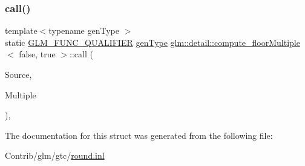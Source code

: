 \subsubsection{\texorpdfstring{call()}{call()}}
{\footnotesize\ttfamily template$<$typename gen\+Type $>$ \\
static \mbox{\hyperlink{setup_8hpp_a33fdea6f91c5f834105f7415e2a64407}{G\+L\+M\+\_\+\+F\+U\+N\+C\+\_\+\+Q\+U\+A\+L\+I\+F\+I\+ER}} \mbox{\hyperlink{structglm_1_1detail_1_1gen_type}{gen\+Type}} \mbox{\hyperlink{structglm_1_1detail_1_1compute__floor_multiple}{glm\+::detail\+::compute\+\_\+floor\+Multiple}}$<$ false, true $>$\+::call (\begin{DoxyParamCaption}\item[{\mbox{\hyperlink{structglm_1_1detail_1_1gen_type}{gen\+Type}}}]{Source,  }\item[{\mbox{\hyperlink{structglm_1_1detail_1_1gen_type}{gen\+Type}}}]{Multiple }\end{DoxyParamCaption})\hspace{0.3cm}{\ttfamily [inline]}, {\ttfamily [static]}}



The documentation for this struct was generated from the following file\+:\begin{DoxyCompactItemize}
\item 
Contrib/glm/gtc/\mbox{\hyperlink{round_8inl}{round.\+inl}}\end{DoxyCompactItemize}
